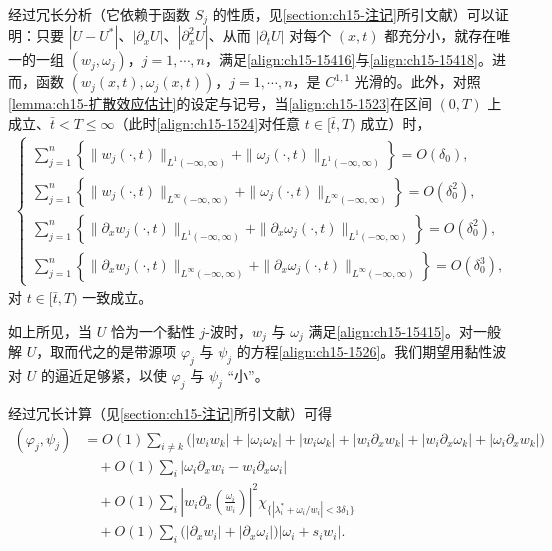 \documentclass[../../main.tex]{subfiles}
\begin{document}
经过冗长分析（它依赖于函数 $S_j$ 的性质，见\cref{section:ch15-注记}所引文献）可以证明：只要 $|U-U^*|$、$|\partial_xU|$、$|\partial_x^2U|$、从而 $|\partial_tU|$ 对每个 $(x,t)$ 都充分小，就存在唯一的一组 $(w_j,\omega_j)$，$j=1,\cdots,n$，满足\eqref{align:ch15-15416}与\eqref{align:ch15-15418}。进而，函数 $(w_j(x,t),\omega_j(x,t))$，$j=1,\cdots,n$，是 $C^{1,1}$ 光滑的。此外，对照\cref{lemma:ch15-扩散效应估计}的设定与记号，当\eqref{align:ch15-1523}在区间 $(0,T)$ 上成立、$\bar t<T\leqslant\infty$（此时\eqref{align:ch15-1524}对任意 $t\in[\bar t,T)$ 成立）时，
\begin{align}
\begin{cases}
\displaystyle\sum_{j=1}^n\left\{\|w_j(\cdot,t)\|_{L^1(-\infty,\infty)}+\|\omega_j(\cdot,t)\|_{L^1(-\infty,\infty)}\right\}=O(\delta_0),\\[2mm]
\displaystyle\sum_{j=1}^n\left\{\|w_j(\cdot,t)\|_{L^\infty(-\infty,\infty)}+\|\omega_j(\cdot,t)\|_{L^\infty(-\infty,\infty)}\right\}=O(\delta_0^2),\\[2mm]
\displaystyle\sum_{j=1}^n\left\{\|\partial_xw_j(\cdot,t)\|_{L^1(-\infty,\infty)}+\|\partial_x\omega_j(\cdot,t)\|_{L^1(-\infty,\infty)}\right\}=O(\delta_0^2),\\[2mm]
\displaystyle\sum_{j=1}^n\left\{\|\partial_xw_j(\cdot,t)\|_{L^\infty(-\infty,\infty)}+\|\partial_x\omega_j(\cdot,t)\|_{L^\infty(-\infty,\infty)}\right\}=O(\delta_0^3),
\end{cases}
\label{align:ch15-15420}
\end{align}
对 $t\in[\bar t,T)$ 一致成立。

如上所见，当 $U$ 恰为一个黏性 $j$-波时，$w_j$ 与 $\omega_j$ 满足\eqref{align:ch15-15415}。对一般解 $U$，取而代之的是带源项 $\varphi_j$ 与 $\psi_j$ 的方程\eqref{align:ch15-1526}。我们期望用黏性波对 $U$ 的逼近足够紧，以使 $\varphi_j$ 与 $\psi_j$ “小”。

经过冗长计算（见\cref{section:ch15-注记}所引文献）可得
\begin{align}
(\varphi_j,\psi_j)&=O(1)\sum_{i\neq k}\bigl(|w_iw_k|+|\omega_i\omega_k|+|w_i\omega_k|+|w_i\partial_xw_k|+|w_i\partial_x\omega_k|+|\omega_i\partial_xw_k|\bigr)\nonumber\\
&\quad+O(1)\sum_i|\omega_i\partial_xw_i-w_i\partial_x\omega_i|\nonumber\\
&\quad+O(1)\sum_i\left|w_i\partial_x\left(\frac{\omega_i}{w_i}\right)\right|^2\chi_{\{|\lambda_i^*+\omega_i/w_i|<3\delta_1\}}\nonumber\\
&\quad+O(1)\sum_i\bigl(|\partial_xw_i|+|\partial_x\omega_i|\bigr)|\omega_i+s_iw_i|.
\label{align:ch15-15421}
\end{align}
\end{document}

